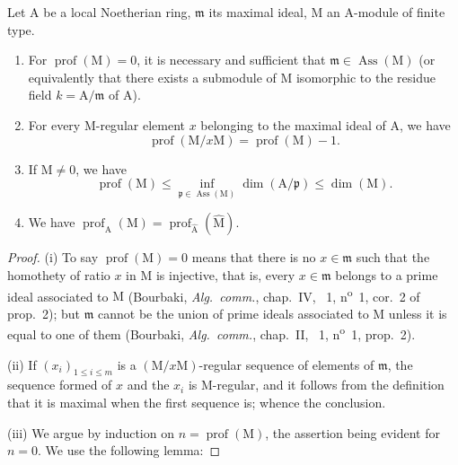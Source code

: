\begin{proposition}[16.4.6]
\label{0.16.4.6}
Let $\mathrm{A}$ be a local Noetherian ring, $\mathfrak{m}$ its maximal ideal, $\mathrm{M}$ an $\mathrm{A}$-module of finite type.
\begin{enumerate}
  \item[\rm{(i)}]\label{0.16.4.6.i} For $\operatorname{prof}(\mathrm{M})=0$, it is necessary and sufficient that $\mathfrak{m}\in\operatorname{Ass}(\mathrm{M})$ (or equivalently that there exists a submodule of $\mathrm{M}$ isomorphic to the residue field $k=\mathrm{A}/\mathfrak{m}$ of $\mathrm{A}$).
  \item[\rm{(ii)}] For every $\mathrm{M}$-regular element $x$ belonging to the maximal ideal of $\mathrm{A}$, we have
  \begin{equation}
  \label{0.16.4.6.1}
  \tag{16.4.6.1}
    \operatorname{prof}(\mathrm{M}/x\mathrm{M})=\operatorname{prof}(\mathrm{M})-1.
  \end{equation}
  \item[\rm{(iii)}] If $\mathrm{M}\neq 0$, we have
  \begin{equation}
  \label{0.16.4.6.2}
  \tag{16.4.6.2}
    \operatorname{prof}(\mathrm{M})\leq\inf_{\mathfrak{p}\in\operatorname{Ass}(\mathrm{M})}\dim(\mathrm{A}/\mathfrak{p})\leq\dim(\mathrm{M}).
  \end{equation}
  \item[\rm{(iv)}] We have $\operatorname{prof}_\mathrm{A}(\mathrm{M})=\operatorname{prof}_{\widehat{\mathrm{A}}}(\widehat{\mathrm{M}})$.
\end{enumerate}
\end{proposition}

\begin{proof}
(i) To say $\operatorname{prof}(\mathrm{M})=0$ means that there is no $x\in\mathfrak{m}$ such that the homothety of ratio $x$ in $\mathrm{M}$ is injective, that is, every $x\in\mathfrak{m}$ belongs to a prime ideal associated to $\mathrm{M}$ (Bourbaki, \emph{Alg.~comm.}, chap.~IV, \textsection~1, n\textsuperscript{o}~1, cor.~2 of prop.~2); but $\mathfrak{m}$ cannot be the union of prime ideals associated to $\mathrm{M}$ unless it is equal to one of them (Bourbaki, \emph{Alg.~comm.}, chap.~II, \textsection~1, n\textsuperscript{o}~1, prop.~2).

(ii) If $(x_i)_{1\leq i\leq m}$ is a $(\mathrm{M}/x\mathrm{M})$-regular sequence of elements of $\mathfrak{m}$, the sequence formed of $x$ and the $x_i$ is $\mathrm{M}$-regular, and it follows from the definition that it is maximal when the first sequence is; whence the conclusion.

(iii) We argue by induction on $n=\operatorname{prof}(\mathrm{M})$, the assertion being evident for $n=0$.
We use the following lemma:
\end{proof}

